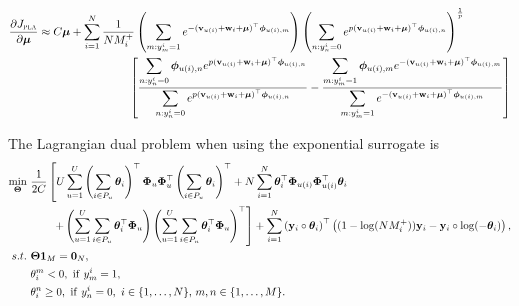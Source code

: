 \begin{equation*}
\begin{aligned}
%
\frac{\partial J_\textsc{pla}}{\partial \mubm}
&\approx C \mubm
  + \sum_{i=1}^N \frac{1}{N M_i^+} 
    \left( \sum_{m: y_m^i = 1} e^{-(\bv_{u(i)} + \w_i + \mubm)^\top \phibm_{u(i),m}} \right)
    \left( \sum_{n: y_n^i = 0} e^{p (\bv_{u(i)} + \w_i + \mubm)^\top \phibm_{u(i),n}} \right)^\frac{1}{p} \\
& \hspace{8em} \left[ 
    \frac{ \displaystyle \sum_{n: y_n^i = 0} \phibm_{u(i),n} e^{p (\bv_{u(i)} + \w_i + \mubm)^\top \phibm_{u(i),n}} }
         { \displaystyle \sum_{n: y_n^i = 0} e^{p (\bv_{u(i)} + \w_i + \mubm)^\top \phibm_{u(i),n}} }
    - \frac{ \displaystyle \sum_{m: y_m^i = 1} \phibm_{u(i),m} e^{-(\bv_{u(i)} + \w_i + \mubm)^\top \phibm_{u(i),m}} }
           { \displaystyle \sum_{m: y_m^i = 1} e^{-(\bv_{u(i)} + \w_i + \mubm)^\top \phibm_{u(i),m}} } \right]
\end{aligned}
\end{equation*}


The Lagrangian dual problem when using the exponential surrogate is
\begin{equation}
\label{eq:dual_pla}
\begin{aligned}
\min_{\Thetabm} \ & \frac{1}{2 C} \left[
     U \sum_{u=1}^U \left( \sum_{i \in P_u} \thetabm_i \right)^\top \Phibm_u \Phibm_u^\top \left( \sum_{i \in P_u} \thetabm_i \right)^\top
   + N \sum_{i=1}^N \thetabm_i^\top \Phibm_{u(i)} \Phibm_{u(i)}^\top \thetabm_i \right. \\
& \hspace{2em} \left.
   + \left( \sum_{u=1}^U \sum_{i \in P_u} \thetabm_i^\top \Phibm_u \right)
     \left( \sum_{u=1}^U \sum_{i \in P_u} \thetabm_i^\top \Phibm_u \right)^\top \right]
   + \sum_{i=1}^N \left( \y_i \circ \thetabm_i \right)^\top 
     \left( (1 - \log(N M_i^+)) \y_i - \y_i \circ \log(-\thetabm_i) \right), \\
s.t. \ 
& \Thetabm \one_M = \zero_N, \\
&\theta_i^m < 0, \ \mathrm{if} \ y_m^i = 1, \\
&\theta_i^n \ge 0, \ \mathrm{if} \ y_n^i = 0, \ i \in \{1,\dots,N\}, \, m,n \in \{1,\dots,M\}.
\end{aligned}
\end{equation}

